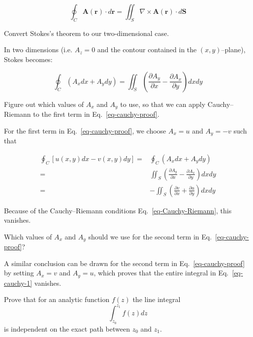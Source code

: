 \begin{equation}
\oint_{{{C}}} {\mathbf A}(\mathbf{r}) \cdot d {\mathbf r} = \iint_S \nabla \times {\mathbf A}(\mathbf{r}) \cdot d {\mathbf S}
\end{equation}

\begin{cue}
Convert Stokes's theorem to our two-dimensional case.
\end{cue}

In two dimensions (i.e. $A_z=0$ and the contour contained in the $(x,y)$--plane), Stokes becomes:

\begin{equation}
\oint_{{C}} \left(A_x dx + A_y dy\right) = \iint_S \left(\frac{\partial
A_y}{\partial x} - \frac{\partial A_x}{\partial y} \right)dx dy
\end{equation} 

\begin{cue}
Figure out which values of $A_x$ and $A_y$ to use, so that we can apply Cauchy--Riemann to the first term in Eq.~\ref{eq-cauchy-proof}.
\end{cue}

For the first term in Eq.~\ref{eq-cauchy-proof}, we choose $A_x=u$ and $A_y=-v$ such that

\begin{align}
\oint_{C}\left[u(x,y)dx-v(x,y)dy\right] =& \oint_{{C}} \left(A_x dx + A_y dy\right) \nonumber \\
=& \iint_S \left(\frac{\partial A_y}{\partial x} - \frac{\partial A_x}{\partial y} \right)dx dy \nonumber \\ =& -\iint_S \left(\frac{\partial v}{\partial x} + \frac{\partial u}{\partial y} \right)dx dy 
\end{align} 

Because of the Cauchy--Riemann conditions Eq.~\ref{eq-Cauchy-Riemann}, this
vanishes.

\begin{cue}
Which values of $A_x$ and $A_y$ should we use for the second term in Eq.~\ref{eq-cauchy-proof}?
\end{cue}

A similar conclusion can be drawn for the second term in Eq.~\ref{eq-cauchy-proof} by setting $A_x=v$ and $A_y=u$, which proves that the entire integral in Eq.~\ref{eq-cauchy-1} vanishes.

\begin{exer}
Prove that for an analytic function $f(z)$ the line integral 
$$\int_{z_0}^{z_1}f(z)dz$$
is independent on the exact path between $z_0$ and $z_1$.
\end{exer}


